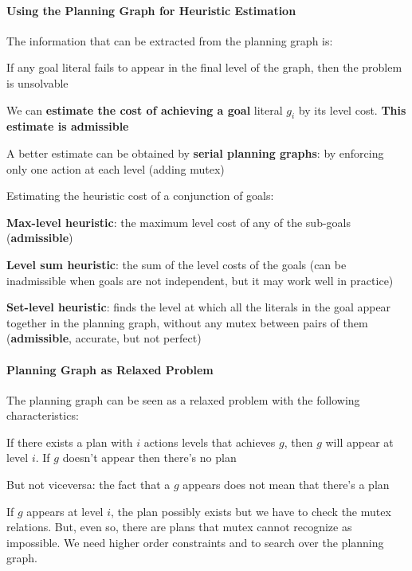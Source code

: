 \documentclass[10pt]{report}
\begin{document}
\paragraph{Using the Planning Graph for Heuristic Estimation} The information that can be extracted from the planning graph is:
\begin{list}{}{}
	\item If any goal literal fails to appear in the final level of the graph, then the problem is unsolvable
	\item We can \textbf{estimate the cost of achieving a goal} literal $g_i$ by its level cost. \textbf{This estimate is admissible}
	\item A better estimate can be obtained by \textbf{serial planning graphs}: by enforcing only one action at each level (adding mutex)
\end{list}
Estimating the heuristic cost of a conjunction of goals:\begin{list}{}{}
	\item \textbf{Max-level heuristic}: the maximum level cost of any of the sub-goals (\textbf{admissible})
	\item \textbf{Level sum heuristic}: the sum of the level costs of the goals (can be inadmissible when
goals are not independent, but it may work well in practice)
	\item \textbf{Set-level heuristic}: finds the level at which all the literals in the goal appear together in the planning graph, without any mutex between pairs of them (\textbf{admissible}, accurate, but not
perfect)
\end{list}
\paragraph{Planning Graph as Relaxed Problem} The planning graph can be seen as a relaxed problem with the following characteristics:
\begin{list}{}{}
	\item If there exists a plan with $i$ actions levels that achieves $g$, then $g$ will appear at level $i$. If $g$ doesn't appear then there's no plan
	\item But not viceversa: the fact that a $g$ appears does not mean that there's a plan
\end{list}
If $g$ appears at level $i$, the plan possibly exists but we have to check the mutex relations. But, even so, there are plans that mutex cannot recognize as impossible. We need higher order constraints and to search over the planning graph.
\end{document}
